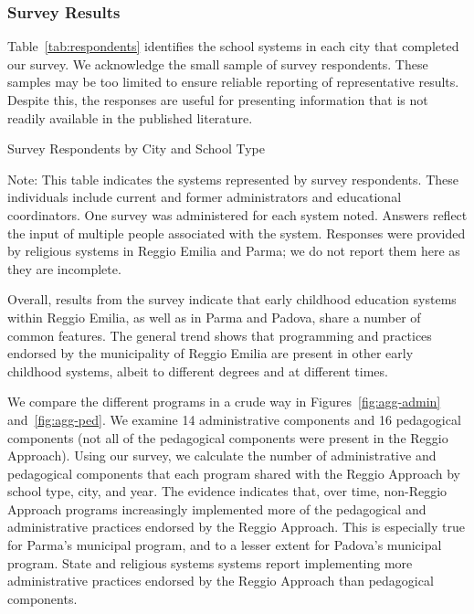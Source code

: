 \subsubsection{Survey Results}

Table~\ref{tab:respondents} identifies the school systems in each city that completed our survey. We acknowledge the small sample of survey respondents. These samples may be too limited to ensure reliable reporting of representative results. Despite this, the responses are useful for presenting information that is not readily available in the published literature.

\begin{table}[H]
\centering
\caption{Survey Respondents by City and School Type}\label{tab:respondents}
\begin{threeparttable}
	
\begin{tablenotes}
\footnotesize Note: This table indicates the systems represented by survey respondents. These individuals include current and former administrators and educational coordinators. One survey was administered for each system noted. Answers reflect the input of multiple people associated with the system. Responses were provided by religious systems in Reggio Emilia and Parma; we do not report them here as they are incomplete. \end{tablenotes}
\end{threeparttable}
\end{table}

Overall, results from the survey indicate that early childhood education systems within Reggio Emilia, as well as in Parma and Padova, share a number of common features. The general trend shows that programming and practices endorsed by the municipality of Reggio Emilia are present in other early childhood systems, albeit to different degrees and at different times.

We compare the different programs in a crude way in Figures~\ref{fig:agg-admin} and~\ref{fig:agg-ped}. We examine 14 administrative components and 16 pedagogical components (not all of the pedagogical components were present in the Reggio Approach). Using our survey, we calculate the number of administrative and pedagogical components that each program shared with the Reggio Approach by school type, city, and year. The evidence indicates that, over time, non-Reggio Approach programs increasingly implemented more of the pedagogical and administrative practices endorsed by the Reggio Approach. This is especially true for Parma's municipal program, and to a lesser extent for Padova's municipal program. State and religious systems systems report implementing more administrative practices endorsed by the Reggio Approach than pedagogical components.

